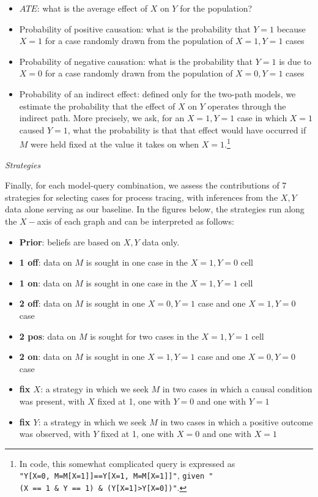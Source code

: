 \documentclass[
  12pt,
]{book}
\providecommand{\tightlist}{%
  \setlength{\itemsep}{0pt}\setlength{\parskip}{0pt}}
\begin{document}
\begin{itemize}
\tightlist
\item
  \(ATE\): what is the average effect of \(X\) on \(Y\) for the population?
\item
  Probability of positive causation: what is the probability that \(Y=1\) because \(X=1\) for a case randomly drawn from the population of \(X=1, Y=1\) cases
\item
  Probability of negative causation: what is the probability that \(Y=1\) is due to \(X=0\) for a case randomly drawn from the population of \(X=0, Y=1\) cases
\item
  Probability of an indirect effect: defined only for the two-path models, we estimate the probability that the effect of \(X\) on \(Y\) operates through the indirect path. More precisely, we ask, for an \(X=1, Y=1\) case in which \(X=1\) caused \(Y=1\), what the probability is that that effect would have occurred if \(M\) were held fixed at the value it takes on when \(X=1\).\footnote{In code, this somewhat complicated query is expressed as \texttt{"Y{[}X=0,\ M=M{[}X=1{]}{]}==Y{[}X=1,\ M=M{[}X=1{]}{]}"}, \texttt{given\ "(X\ ==\ 1\ \&\ Y\ ==\ 1)\ \&\ (Y{[}X=1{]}\textgreater{}Y{[}X=0{]})"}.}
\end{itemize}

\emph{Strategies}

Finally, for each model-query combination, we assess the contributions of 7 strategies for selecting cases for process tracing, with inferences from the \(X,Y\) data alone serving as our baseline. In the figures below, the strategies run along the \(X-\)axis of each graph and can be interpreted as follows:

\begin{itemize}
\tightlist
\item
  \textbf{Prior}: beliefs are based on \(X,Y\) data only.
\item
  \textbf{1 off}: data on \(M\) is sought in one case in the \(X=1, Y=0\) cell
\item
  \textbf{1 on}: data on \(M\) is sought in one case in the \(X=1, Y=1\) cell
\item
  \textbf{2 off}: data on \(M\) is sought in one \(X=0, Y=1\) case and one \(X=1, Y=0\) case
\item
  \textbf{2 pos}: data on \(M\) is sought for two cases in the \(X=1, Y=1\) cell
\item
  \textbf{2 on}: data on \(M\) is sought in one \(X=1, Y=1\) case and one \(X=0, Y=0\) case
\item
  \textbf{fix \(X\)}: a strategy in which we seek \(M\) in two cases in which a causal condition was present, with \(X\) fixed at 1, one with \(Y=0\) and one with \(Y=1\)
\item
  \textbf{fix \(Y\)}: a strategy in which we seek \(M\) in two cases in which a positive outcome was observed, with \(Y\) fixed at 1, one with \(X=0\) and one with \(X=1\)
\end{itemize}
\end{document}
